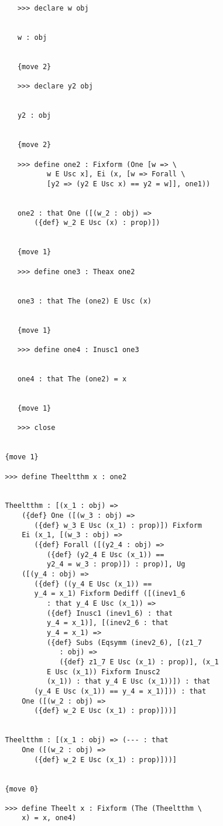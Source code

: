 \documentclass[12pt]{article}
\begin{document}
\begin{verbatim}
      >>> declare w obj


      w : obj


      {move 2}

      >>> declare y2 obj


      y2 : obj


      {move 2}

      >>> define one2 : Fixform (One [w => \
             w E Usc x], Ei (x, [w => Forall \
             [y2 => (y2 E Usc x) == y2 = w]], one1))


      one2 : that One ([(w_2 : obj) => 
          ({def} w_2 E Usc (x) : prop)])


      {move 1}

      >>> define one3 : Theax one2


      one3 : that The (one2) E Usc (x)


      {move 1}

      >>> define one4 : Inusc1 one3


      one4 : that The (one2) = x


      {move 1}

      >>> close


   {move 1}

   >>> define Theeltthm x : one2


   Theeltthm : [(x_1 : obj) => 
       ({def} One ([(w_3 : obj) => 
          ({def} w_3 E Usc (x_1) : prop)]) Fixform 
       Ei (x_1, [(w_3 : obj) => 
          ({def} Forall ([(y2_4 : obj) => 
             ({def} (y2_4 E Usc (x_1)) == 
             y2_4 = w_3 : prop)]) : prop)], Ug 
       ([(y_4 : obj) => 
          ({def} ((y_4 E Usc (x_1)) == 
          y_4 = x_1) Fixform Dediff ([(inev1_6 
             : that y_4 E Usc (x_1)) => 
             ({def} Inusc1 (inev1_6) : that 
             y_4 = x_1)], [(inev2_6 : that 
             y_4 = x_1) => 
             ({def} Subs (Eqsymm (inev2_6), [(z1_7 
                : obj) => 
                ({def} z1_7 E Usc (x_1) : prop)], (x_1 
             E Usc (x_1)) Fixform Inusc2 
             (x_1)) : that y_4 E Usc (x_1))]) : that 
          (y_4 E Usc (x_1)) == y_4 = x_1)])) : that 
       One ([(w_2 : obj) => 
          ({def} w_2 E Usc (x_1) : prop)]))]


   Theeltthm : [(x_1 : obj) => (--- : that 
       One ([(w_2 : obj) => 
          ({def} w_2 E Usc (x_1) : prop)]))]


   {move 0}

   >>> define Theelt x : Fixform (The (Theeltthm \
       x) = x, one4)



\end{verbatim}
\end{document}
